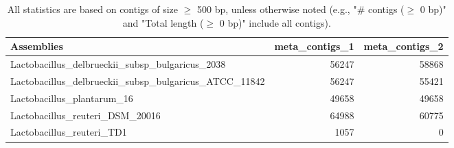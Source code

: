 \documentclass[12pt,a4paper]{article}
\begin{document}
\begin{table}[ht]
\begin{center}
\caption{All statistics are based on contigs of size $\geq$ 500 bp, unless otherwise noted (e.g., "\# contigs ($\geq$ 0 bp)" and "Total length ($\geq$ 0 bp)" include all contigs).}
\begin{tabular}{|l*{2}{|r}|}
\hline
Assemblies & meta\_contigs\_1 & meta\_contigs\_2 \\ \hline
Lactobacillus\_delbrueckii\_subsp\_bulgaricus\_2038 & 56247 & 58868 \\ \hline
Lactobacillus\_delbrueckii\_subsp\_bulgaricus\_ATCC\_11842 & 56247 & 55421 \\ \hline
Lactobacillus\_plantarum\_16 & 49658 & 49658 \\ \hline
Lactobacillus\_reuteri\_DSM\_20016 & 64988 & 60775 \\ \hline
Lactobacillus\_reuteri\_TD1 & 1057 & 0 \\ \hline
\end{tabular}
\end{center}
\end{table}
\end{document}
